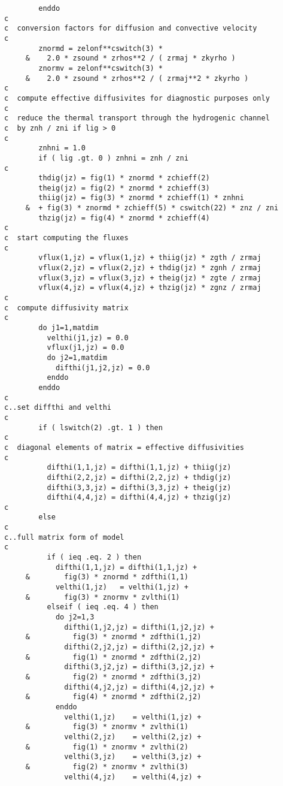 \begin{verbatim}
        enddo
c
c  conversion factors for diffusion and convective velocity
c
        znormd = zelonf**cswitch(3) *
     &    2.0 * zsound * zrhos**2 / ( zrmaj * zkyrho )
        znormv = zelonf**cswitch(3) *
     &    2.0 * zsound * zrhos**2 / ( zrmaj**2 * zkyrho )
c
c  compute effective diffusivites for diagnostic purposes only
c
c  reduce the thermal transport through the hydrogenic channel
c  by znh / zni if lig > 0
c
        znhni = 1.0
        if ( lig .gt. 0 ) znhni = znh / zni
c
        thdig(jz) = fig(1) * znormd * zchieff(2)
        theig(jz) = fig(2) * znormd * zchieff(3)
        thiig(jz) = fig(3) * znormd * zchieff(1) * znhni
     &  + fig(3) * znormd * zchieff(5) * cswitch(22) * znz / zni
        thzig(jz) = fig(4) * znormd * zchieff(4)
c
c  start computing the fluxes
c
        vflux(1,jz) = vflux(1,jz) + thiig(jz) * zgth / zrmaj
        vflux(2,jz) = vflux(2,jz) + thdig(jz) * zgnh / zrmaj
        vflux(3,jz) = vflux(3,jz) + theig(jz) * zgte / zrmaj
        vflux(4,jz) = vflux(4,jz) + thzig(jz) * zgnz / zrmaj
c
c  compute diffusivity matrix
c
        do j1=1,matdim
          velthi(j1,jz) = 0.0
          vflux(j1,jz) = 0.0
          do j2=1,matdim
            difthi(j1,j2,jz) = 0.0
          enddo
        enddo
c
c..set diffthi and velthi
c
        if ( lswitch(2) .gt. 1 ) then
c
c  diagonal elements of matrix = effective diffusivities
c
          difthi(1,1,jz) = difthi(1,1,jz) + thiig(jz)
          difthi(2,2,jz) = difthi(2,2,jz) + thdig(jz)
          difthi(3,3,jz) = difthi(3,3,jz) + theig(jz)
          difthi(4,4,jz) = difthi(4,4,jz) + thzig(jz)
c
        else
c
c..full matrix form of model
c
          if ( ieq .eq. 2 ) then
            difthi(1,1,jz) = difthi(1,1,jz) +
     &        fig(3) * znormd * zdfthi(1,1)
            velthi(1,jz)   = velthi(1,jz) +
     &        fig(3) * znormv * zvlthi(1)
          elseif ( ieq .eq. 4 ) then
            do j2=1,3
              difthi(1,j2,jz) = difthi(1,j2,jz) +
     &          fig(3) * znormd * zdfthi(1,j2)
              difthi(2,j2,jz) = difthi(2,j2,jz) +
     &          fig(1) * znormd * zdfthi(2,j2)
              difthi(3,j2,jz) = difthi(3,j2,jz) +
     &          fig(2) * znormd * zdfthi(3,j2)
              difthi(4,j2,jz) = difthi(4,j2,jz) +
     &          fig(4) * znormd * zdfthi(2,j2)
            enddo
              velthi(1,jz)    = velthi(1,jz) +
     &          fig(3) * znormv * zvlthi(1)
              velthi(2,jz)    = velthi(2,jz) +
     &          fig(1) * znormv * zvlthi(2)
              velthi(3,jz)    = velthi(3,jz) +
     &          fig(2) * znormv * zvlthi(3)
              velthi(4,jz)    = velthi(4,jz) +

\end{verbatim}
